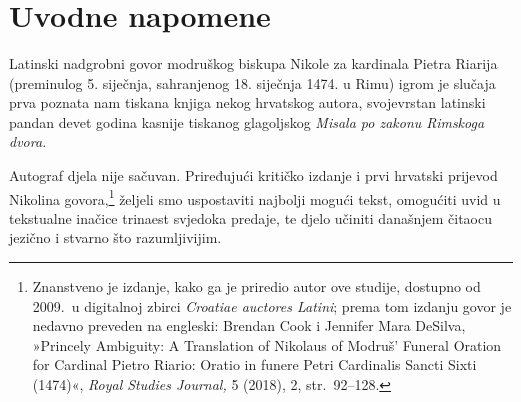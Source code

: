\documentclass[a5paper,twoside]{article}
\renewcommand\Large{\fontsize{12.5}{13} \selectfont}
\begin{document}


\frenchspacing

\fontsize{11}{13.2}
\selectfont

\linespread{1.1}

\setlength{\parindent}{7mm}

\setcounter{page}{169}

\title{\Large{\MakeUppercase{Govor za Pietra Riarija (1474)}}}

\date{}%

\maketitle 

\thispagestyle{empty}

\section{Uvodne napomene}

Latinski nadgrobni govor modruškog biskupa Nikole za kardinala Pietra Riarija (preminulog 5. siječnja, sahranjenog 18. siječnja 1474. u Rimu) igrom je slučaja prva poznata nam tiskana knjiga nekog hrvatskog autora, svojevrstan latinski pandan devet godina kasnije tiskanog glagoljskog \textit{Misala po zakonu Rimskoga dvora.}

Autograf djela nije sačuvan. Priređujući kritičko izdanje i prvi hrvatski prijevod Nikolina govora,\footnote{Znanstveno je izdanje, kako ga je priredio autor ove studije, dostupno od 2009.\ u digitalnoj zbirci \textit{\textlatin{Croatiae auctores Latini}}; prema tom izdanju govor je nedavno preveden na engleski: Brendan Cook i Jennifer Mara DeSilva, »Princely Ambiguity: A Translation of Nikolaus of Modruš’ Funeral Oration for Cardinal Pietro Riario: Oratio in funere Petri Cardinalis Sancti Sixti (1474)«, \textit{Royal Studies Journal,} 5 (2018), 2, str.~92–128.} željeli smo uspostaviti najbolji mogući tekst, omogućiti uvid u tekstualne inačice trinaest svjedoka predaje, te djelo učiniti današnjem čitaocu jezično i stvarno što razumljivijim.
\end{document}
